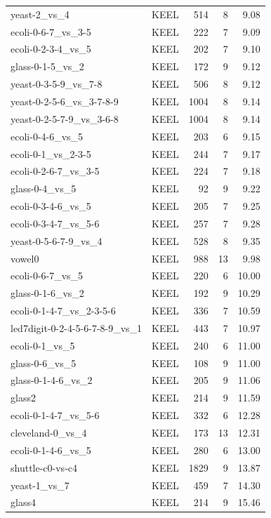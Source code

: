 \begin{longtable}{llrrr}
    yeast-2\_vs\_4 & KEEL & 514 & 8 & 9.08 \\
    ecoli-0-6-7\_vs\_3-5 & KEEL & 222 & 7 & 9.09 \\
    ecoli-0-2-3-4\_vs\_5 & KEEL & 202 & 7 & 9.10 \\
    glass-0-1-5\_vs\_2 & KEEL & 172 & 9 & 9.12 \\
    yeast-0-3-5-9\_vs\_7-8 & KEEL & 506 & 8 & 9.12 \\
    yeast-0-2-5-6\_vs\_3-7-8-9 & KEEL & 1004 & 8 & 9.14 \\
    yeast-0-2-5-7-9\_vs\_3-6-8 & KEEL & 1004 & 8 & 9.14 \\
    ecoli-0-4-6\_vs\_5 & KEEL & 203 & 6 & 9.15 \\
    ecoli-0-1\_vs\_2-3-5 & KEEL & 244 & 7 & 9.17 \\
    ecoli-0-2-6-7\_vs\_3-5 & KEEL & 224 & 7 & 9.18 \\
    glass-0-4\_vs\_5 & KEEL & 92 & 9 & 9.22 \\
    ecoli-0-3-4-6\_vs\_5 & KEEL & 205 & 7 & 9.25 \\
    ecoli-0-3-4-7\_vs\_5-6 & KEEL & 257 & 7 & 9.28 \\
    yeast-0-5-6-7-9\_vs\_4 & KEEL & 528 & 8 & 9.35 \\
    vowel0 & KEEL & 988 & 13 & 9.98 \\
    ecoli-0-6-7\_vs\_5 & KEEL & 220 & 6 & 10.00 \\
    glass-0-1-6\_vs\_2 & KEEL & 192 & 9 & 10.29 \\
    ecoli-0-1-4-7\_vs\_2-3-5-6 & KEEL & 336 & 7 & 10.59 \\
    led7digit-0-2-4-5-6-7-8-9\_vs\_1 & KEEL & 443 & 7 & 10.97 \\
    ecoli-0-1\_vs\_5 & KEEL & 240 & 6 & 11.00 \\
    glass-0-6\_vs\_5 & KEEL & 108 & 9 & 11.00 \\
    glass-0-1-4-6\_vs\_2 & KEEL & 205 & 9 & 11.06 \\
    glass2 & KEEL & 214 & 9 & 11.59 \\
    ecoli-0-1-4-7\_vs\_5-6 & KEEL & 332 & 6 & 12.28 \\
    cleveland-0\_vs\_4 & KEEL & 173 & 13 & 12.31 \\
    ecoli-0-1-4-6\_vs\_5 & KEEL & 280 & 6 & 13.00 \\
    shuttle-c0-vs-c4 & KEEL & 1829 & 9 & 13.87 \\
    yeast-1\_vs\_7 & KEEL & 459 & 7 & 14.30 \\
    glass4 & KEEL & 214 & 9 & 15.46 \\

\end{longtable}
